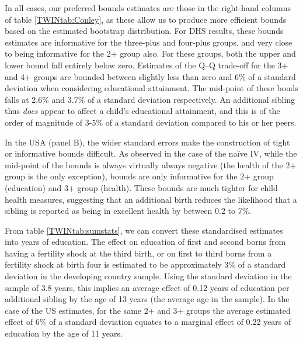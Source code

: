 \documentclass[subeqn]{article}
\begin{document}
\begin{spacing}{1.4}
In all cases, our preferred bounds estimates are those in the right-hand
columns of table \ref{TWINtab:Conley}, as these allow us to produce more
efficient bounds based on the estimated bootstrap distribution.  For DHS
results, these bounds estimates are informative for the three-plus and 
four-plus groups, and very close to being informative for the 2+ group
also.  For these groups, both the upper and lower bound fall entirely below
zero.  Estimates of the Q--Q trade-off for the 3+ and 4+ groups are bounded
between slightly less than zero and 6\% of a standard deviation when
considering educational attainment.  The mid-point of these bouds falls
at 2.6\% and 3.7\% of a standard deviation respectively. An additional
sibling thus \emph{does} appear to affect a child's educational attainment,
and this is of the order of magnitude of 3-5\% of a standard deviation
compared to his or her peers.

In the USA (panel B), the wider standard errors make the construction of tight
or informative bounds difficult.  As observed in the case of the na\"ive IV,
while the mid-point of the bounds is always virtually always negative (the
health of the 2+ group is the only exception), bounds are only informative
for the 2+ group (education) and 3+ group (health).  These bounds are much
tighter for child health measures, suggesting that an additional birth
reduces the likelihood that a sibling is reported as being in excellent health
by between 0.2 to 7\%.

From table \ref{TWINtab:sumstats}, we can convert these standardised estimates
into years of education.  The effect on education of first and second borns
from having a fertility shock at the third birth, or on first to third borns
from a fertility shock at birth four is estimated to be approximately 3\% of
a standard deviation in the developing country sample.  Using the standard
deviation in the sample of 3.8 years, this implies an average effect of 0.12
years of education per additional sibling by the age of 13 years (the average
age in the sample).  In the case of the US estimates, for the same 2+ and 3+
groups the average estimated effect of 6\% of a standard deviation equates to
a marginal effect of 0.22 years of education by the age of 11 years.




\end{spacing}
\end{document}
